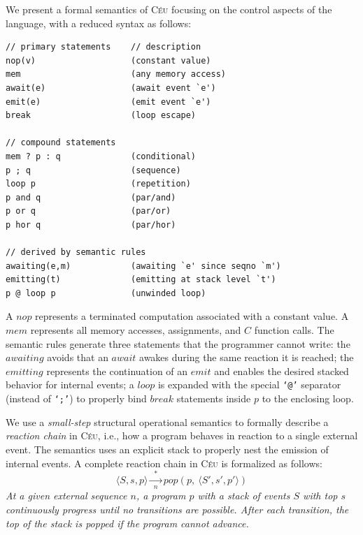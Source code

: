 \documentclass{acm_proc_article-sp}
\newcommand{\CEU}{\textsc{C\'{e}u}\xspace}
\newcommand{\code}[1] {{\small{\texttt{#1}}}}
\newcommand{\LL}{\langle}
\newcommand{\RR}{\rangle}
\newcommand{\1}{\;}
\newcommand{\2}{\;\;}
\newcommand{\3}{\;\;\;}
\newcommand{\5}{\;\;\;\;\;}
\begin{document}
We present a formal semantics of \CEU focusing on the control aspects of the 
language, with a reduced syntax as follows:
%
{\small
\begin{verbatim}
// primary statements    // description
nop(v)                   (constant value)
mem                      (any memory access)
await(e)                 (await event `e')
emit(e)                  (emit event `e')
break                    (loop escape)

// compound statements
mem ? p : q              (conditional)
p ; q                    (sequence)
loop p                   (repetition)
p and q                  (par/and)
p or q                   (par/or)
p hor q                  (par/hor)

// derived by semantic rules
awaiting(e,m)            (awaiting `e' since seqno `m')
emitting(t)              (emitting at stack level `t')
p @ loop p               (unwinded loop)
\end{verbatim}
}%
%
A $nop$ represents a terminated computation associated with a constant value.
A $mem$ represents all memory accesses, assignments, and $C$ function calls.
%
%
The semantic rules generate three statements that the programmer cannot write:
the $awaiting$ avoids that an $await$ awakes during the same reaction it is 
reached;
the $emitting$ represents the continuation of an $emit$ and enables the desired 
stacked behavior for internal events;
a $loop$ is expanded with the special \code{`@'} separator (instead of 
\code{`;'}) to properly bind $break$ statements inside $p$ to the enclosing 
loop.


We use a \emph{small-step} structural operational semantics to formally 
describe a \emph{reaction chain} in \CEU, i.e., how a program behaves in 
reaction to a single external event.
%
The semantics uses an explicit stack to properly nest the emission of internal 
events.
%
A complete reaction chain in \CEU is formalized as follows:
%
$$
\LL S, s, p \RR
    \xrightarrow[~~n~~]{~~*~~}
pop(p,~\LL S', s', p' \RR)
$$
%
\emph{At a given external sequence $n$, a program $p$ with a stack of events 
$S$ with top $s$ continuously progress until no transitions are possible.
After each transition, the top of the stack is popped if the program cannot 
advance.}
\end{document}

